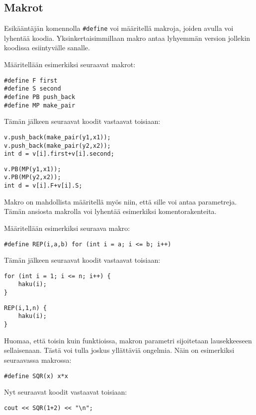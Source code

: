 \subsection{Makrot}


Esikääntäjän komennolla \texttt{\#define}
voi määritellä makroja, joiden avulla voi lyhentää
koodia. Yksinkertaisimmillaan makro antaa lyhyemmän
version jollekin koodissa esiintyvälle sanalle.

Määritellään esimerkiksi seuraavat makrot:
\begin{lstlisting}
#define F first
#define S second
#define PB push_back
#define MP make_pair
\end{lstlisting}
Tämän jälkeen seuraavat koodit vastaavat toisiaan:
\begin{lstlisting}
v.push_back(make_pair(y1,x1));
v.push_back(make_pair(y2,x2));
int d = v[i].first+v[i].second;
\end{lstlisting}
\begin{lstlisting}
v.PB(MP(y1,x1));
v.PB(MP(y2,x2));
int d = v[i].F+v[i].S;
\end{lstlisting}
Makro on mahdollista määritellä myös niin,
että sille voi antaa parametreja.
Tämän ansiosta makrolla voi lyhentää esimerkiksi
komentorakenteita.

Määritellään esimerkiksi seuraava makro:
\begin{lstlisting}
#define REP(i,a,b) for (int i = a; i <= b; i++)
\end{lstlisting}
Tämän jälkeen seuraavat koodit vastaavat toisiaan:
\begin{lstlisting}
for (int i = 1; i <= n; i++) {
    haku(i);
}
\end{lstlisting}
\begin{lstlisting}
REP(i,1,n) {
    haku(i);
}
\end{lstlisting}

Huomaa, että toisin kuin funktioissa,
makron parametri sijoitetaan lausekkeeseen
sellaisenaan.
Tästä voi tulla joskus yllättäviä ongelmia.
Näin on esimerkiksi seuraavassa makrossa:

\begin{lstlisting}
#define SQR(x) x*x
\end{lstlisting}

Nyt seuraavat koodit vastaavat toisiaan:

\begin{lstlisting}
cout << SQR(1+2) << "\n";
\end{lstlisting}

